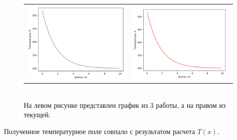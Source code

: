 \documentclass[a4paper,14pt]{extreport} %
\begin{document}
\begin{enumerate}
\begin{figure}[ht]\center
	\begin{tabular}{cc}
		\includegraphics[width=90mm]{11} & \includegraphics[width=90mm]{12}
	\end{tabular}
	\\ На левом рисунке представлен график из 3 работы, а на правом из текущей. 
\end{figure}

Полученное температурное поле совпало с результатом расчета $T(x)$. 

\end{enumerate}
\end{document}
